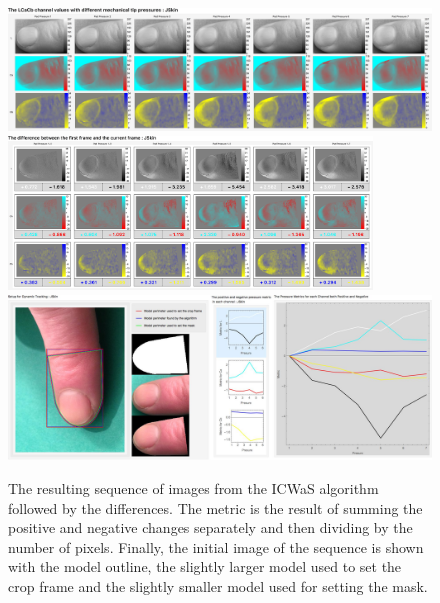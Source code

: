 \begin{figure}[h!]
  \centering
    \includegraphics[width=1.00\textwidth]{Chapter4/Figs/Final_Fig_Channels_JSkin.jpg}
    \includegraphics[width=0.86\textwidth]{Chapter4/Figs/Final_Fig_Total_Difference_JSkin.jpg}
    \includegraphics[width=1.00\textwidth]{Chapter4/Figs/Final_Fig_Misc_JSkin.jpg}
    \caption{The resulting sequence of images from the ICWaS algorithm followed by the differences. The metric is the result of summing the positive and negative changes separately and then dividing by the number of pixels. Finally, the initial image of the sequence is shown with the model outline, the slightly larger model used to set the crop frame and the slightly smaller model used for setting the mask.}\label{fig:ICWaSResultJSkin}
\end{figure}

